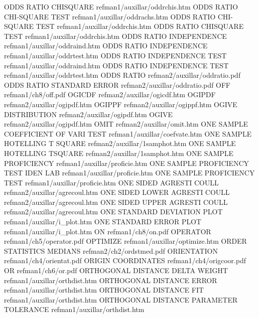 ODDS RATIO CHISQUARE                    refman1/auxillar/oddrchis.htm
ODDS RATIO CHI-SQUARE TEST              refman1/auxillar/oddrachs.htm
ODDS RATIO CHI-SQUARE TEST              refman1/auxillar/oddrchis.htm
ODDS RATIO CHISQUARE TEST               refman1/auxillar/oddrchis.htm
ODDS RATIO INDEPENDENCE                 refman1/auxillar/oddraind.htm
ODDS RATIO INDEPENDENCE                 refman1/auxillar/oddrtest.htm
ODDS RATIO INDEPENDENCE TEST            refman1/auxillar/oddraind.htm
ODDS RATIO INDEPENDENCE TEST            refman1/auxillar/oddrtest.htm
ODDS RATIO                              refman2/auxillar/oddratio.pdf
ODDS RATIO STANDARD ERROR               refman2/auxillar/oddratio.pdf
OFF                                     refman1/ch8/off.pdf
OGICDF                                  refman2/auxillar/ogicdf.htm
OGIPDF                                  refman2/auxillar/ogipdf.htm
OGIPPF                                  refman2/auxillar/ogippf.htm
OGIVE DISTRIBUTION                      refman2/auxillar/ogipdf.htm
OGIVE                                   refman2/auxillar/ogipdf.htm
OMIT                                    refman2/auxillar/omit.htm
ONE SAMPLE COEFFICIENT OF VARI TEST     refman1/auxillar/coefvate.htm
ONE SAMPLE HOTELLING T SQUARE           refman2/auxillar/1samphot.htm
ONE SAMPLE HOTELLING TSQUARE            refman2/auxillar/1samphot.htm
ONE SAMPLE PROFICIENCY                  refman1/auxillar/proficie.htm
ONE SAMPLE PROFICIENCY TEST IDEN LAB    refman1/auxillar/proficie.htm
ONE SAMPLE PROFICIENCY TEST             refman1/auxillar/proficie.htm
ONE SIDED AGRESTI COULL                 refman2/auxillar/agrecoul.htm
ONE SIDED LOWER AGRESTI COULL           refman2/auxillar/agrecoul.htm
ONE SIDED UPPER AGRESTI COULL           refman2/auxillar/agrecoul.htm
ONE STANDARD DEVIATION PLOT             refman1/auxillar/i_plot.htm
ONE STANDARD ERROR PLOT                 refman1/auxillar/i_plot.htm
ON                                      refman1/ch8/on.pdf
OPERATOR                                refman1/ch5/operator.pdf
OPTIMIZE                                refman1/auxillar/optimize.htm
ORDER STATISTICS MEDIANS                refman2/ch2/ordstmed.pdf
ORIENTATION                             refman1/ch4/orientat.pdf
ORIGIN COORDINATES                      refman1/ch4/origcoor.pdf
OR                                      refman1/ch6/or.pdf
ORTHOGONAL DISTANCE DELTA WEIGHT        refman1/auxillar/orthdist.htm
ORTHOGONAL DISTANCE ERROR               refman1/auxillar/orthdist.htm
ORTHOGONAL DISTANCE FIT                 refman1/auxillar/orthdist.htm
ORTHOGONAL DISTANCE PARAMETER TOLERANCE refman1/auxillar/orthdist.htm
